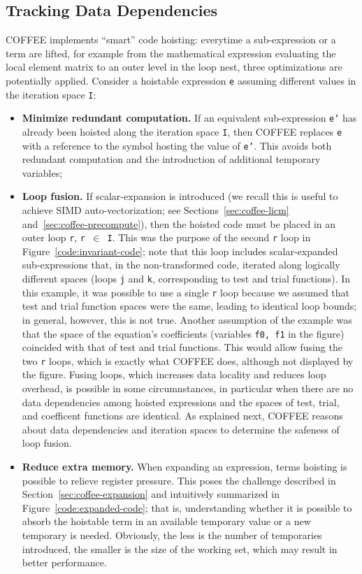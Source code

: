 \subsection{Tracking Data Dependencies}
COFFEE implements ``smart'' code hoisting: everytime a sub-expression or a term are lifted, for example from the mathematical expression evaluating the local element matrix to an outer level in the loop nest, three optimizations are potentially applied. Consider a hoistable expression \texttt{e} assuming different values in the iteration space \texttt{I}:
\begin{itemize}
\item \textbf{Minimize redundant computation.} If an equivalent sub-expression \texttt{e'} has already been hoisted along the iteration space \texttt{I}, then COFFEE replaces \texttt{e} with a reference to the symbol hosting the value of \texttt{e'}. This avoids both redundant computation and the introduction of additional temporary variables;
\item \textbf{Loop fusion.} If scalar-expansion is introduced (we recall this is useful to achieve SIMD auto-vectorization; see Sections~\ref{sec:coffee-licm} and~\ref{sec:coffee-precompute}), then the hoisted code must be placed in an outer loop \texttt{r}, \texttt{r $\in$ I}. This was the purpose of the second \texttt{r} loop in Figure~\ref{code:invariant-code}; note that this loop includes scalar-expanded sub-expressions that, in the non-transformed code, iterated along logically different spaces (loops \texttt{j} and \texttt{k}, corresponding to test and trial functions). In this example, it was possible to use a single \texttt{r} loop because we assumed that test and trial function spaces were the same, leading to identical loop bounds; in general, however, this is not true. Another assumption of the example was that the space of the equation's coefficients (variables \texttt{f0, f1} in the figure) coincided with that of test and trial functions. This would allow fusing the two \texttt{r} loops, which is exactly what COFFEE does, although not displayed by the figure. Fusing loops, which increases data locality and reduces loop overhead, is possible in some circumnstances, in particular when there are no data dependencies among hoisted expressions and the spaces of test, trial, and coefficent functions are identical. As explained next, COFFEE reasons about data dependencies and iteration spaces to determine the safeness of loop fusion.
\item \textbf{Reduce extra memory.} When expanding an expression, terms hoisting is possible to relieve register pressure. This poses the challenge described in Section~\ref{sec:coffee-expansion} and intuitively summarized in Figure~\ref{code:expanded-code}; that is, understanding whether it is possible to absorb the hoistable term in an available temporary value or a new temporary is needed. Obviously, the less is the number of temporaries introduced, the smaller is the size of the working set, which may result in better performance.
\end{itemize}
